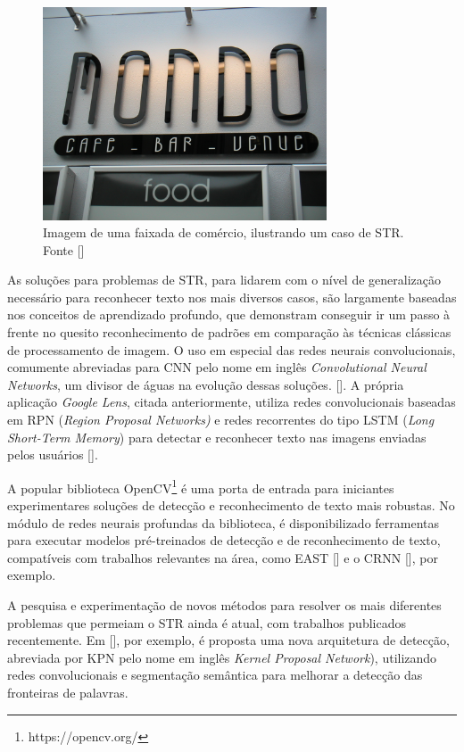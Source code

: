 \begin{figure}
    \centering
    \includegraphics[width=0.75\textwidth]{figs/img_139.jpg}
    \caption{Imagem de uma faixada de comércio, ilustrando um caso de STR. Fonte []}
    \label{fig:str-example}
\end{figure}

As soluções para problemas de STR, para lidarem com o nível de generalização necessário para reconhecer texto nos mais diversos casos, são largamente 
baseadas nos conceitos de aprendizado profundo, que demonstram conseguir ir um passo à frente no quesito reconhecimento de padrões em comparação às 
técnicas clássicas de processamento de imagem. O uso em especial das redes neurais convolucionais, 
comumente abreviadas para CNN pelo nome em inglês \textit{Convolutional Neural Networks}, um divisor de águas na evolução dessas soluções. 
[]. A própria aplicação \textit{Google Lens}, citada anteriormente, utiliza redes convolucionais baseadas em RPN (\textit{Region Proposal Networks)} e redes recorrentes do tipo LSTM (\textit{Long Short-Term Memory}) para detectar e reconhecer texto nas imagens enviadas pelos usuários [].

A popular biblioteca OpenCV\footnote{https://opencv.org/} é uma porta de entrada para iniciantes experimentares soluções de detecção e reconhecimento de texto mais robustas. No módulo de redes neurais profundas da biblioteca, é disponibilizado ferramentas para executar modelos pré-treinados de detecção e de reconhecimento de texto, compatíveis com trabalhos relevantes na área, como EAST [] e o CRNN [], por exemplo.

A pesquisa e experimentação de novos métodos para resolver os mais diferentes problemas que permeiam o STR ainda é atual, com trabalhos 
publicados recentemente.
Em [], por exemplo, é proposta uma nova arquitetura de detecção, abreviada por KPN pelo nome em inglês \textit{Kernel Proposal Network}), 
utilizando redes convolucionais e segmentação semântica para melhorar a detecção das fronteiras de palavras.

